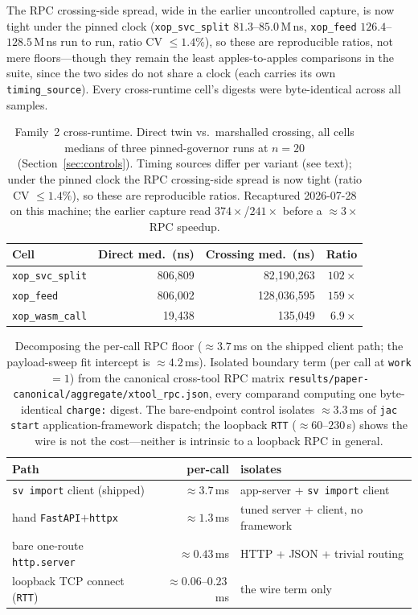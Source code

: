 \documentclass[conference]{IEEEtran}
\newcommand{\code}[1]{\texttt{#1}}
\begin{document}
The RPC crossing-side spread, wide in the earlier uncontrolled capture, is now
tight under the pinned clock (\code{xop\_svc\_split} $81.3$--$85.0$\,M\,ns,
\code{xop\_feed} $126.4$--$128.5$\,M\,ns run to run, ratio CV $\le$$1.4\%$), so
these are reproducible ratios, not mere floors---though they remain the least
apples-to-apples comparisons in the suite, since the two sides
do not share a clock (each carries its own \code{timing\_source}). Every
cross-runtime cell's digests were byte-identical across all samples.

\begin{table}[t]
\caption{Family~2 cross-runtime. Direct twin vs.\ marshalled crossing, all cells
medians of three pinned-governor runs at $n{=}20$ (Section~\ref{sec:controls}).
Timing sources differ per variant (see text); under the pinned clock the RPC
crossing-side spread is now tight (ratio CV $\le$$1.4\%$), so these are
reproducible ratios. Recaptured 2026-07-28 on this machine; the earlier capture
read $374\times$/$241\times$ before a $\approx$$3\times$ RPC speedup.}
\label{tab:xruntime}
\centering
\small
\begin{tabular}{@{}lrrr@{}}
\toprule
Cell & Direct med.\ (ns) & Crossing med.\ (ns) & Ratio \\
\midrule
\code{xop\_svc\_split} & 806{,}809 & 82{,}190{,}263 & $102\times$ \\
\code{xop\_feed}      & 806{,}002 & 128{,}036{,}595 & $159\times$ \\
\code{xop\_wasm\_call} & 19{,}438  & 135{,}049       & $6.9\times$ \\
\bottomrule
\end{tabular}
\end{table}

\begin{table}[t]
\caption{Decomposing the per-call RPC floor ($\approx$$3.7$\,ms on the shipped
client path; the payload-sweep fit intercept is $\approx$$4.2$\,ms). Isolated
boundary term (per call at \code{work}${=}1$) from the canonical cross-tool RPC
matrix \code{results/paper-canonical/aggregate/xtool\_rpc.json}, every comparand
computing one byte-identical \code{charge:} digest. The bare-endpoint control
isolates $\approx$$3.3$\,ms of \code{jac start} application-framework dispatch;
the loopback \code{RTT} ($\approx$$60$--$230$\,\textmu s) shows the wire is not
the cost---neither is intrinsic to a loopback RPC in general.}
\label{tab:rpcfloor}
\centering
\small
\begin{tabular}{@{}lrl@{}}
\toprule
Path & per-call & isolates \\
\midrule
\code{sv~import} client (shipped)    & $\approx$$3.7$\,ms  & app-server + \code{sv~import} client \\
hand \code{FastAPI}$+$\code{httpx}   & $\approx$$1.3$\,ms  & tuned server + client, no framework \\
bare one-route \code{http.server}    & $\approx$$0.43$\,ms & HTTP + JSON + trivial routing \\
loopback TCP connect (\code{RTT})    & $\approx$$0.06$--$0.23$\,ms & the wire term only \\
\bottomrule
\end{tabular}
\end{table}
\end{document}
